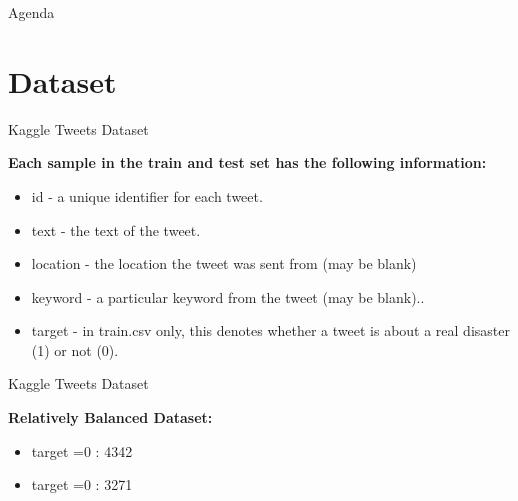 \documentclass[12pt]{beamer}
\begin{document}
{
}
\begin{frame}{Agenda}
  \tableofcontents
\end{frame}

\section{Dataset}

\begin{frame}{Kaggle Tweets Dataset}

\textbf{Each sample in the train and test set has the following information:}
\begin{itemize}
  	\item id - a unique identifier for each tweet.
	 \item text - the text of the tweet.
  	\item location - the location the tweet was sent from (may be blank)
  	\item keyword - a particular keyword from the tweet (may be blank)..
  	\item target - in train.csv only, this denotes whether a tweet is about a real disaster (1) or not (0).
\end{itemize}

\end{frame}


\begin{frame}{Kaggle Tweets Dataset}

\textbf{Relatively Balanced Dataset:}
\begin{itemize}
  	\item target =0 : 4342
	 \item target =0 : 3271

\end{itemize}
\end{frame}
\end{document}
